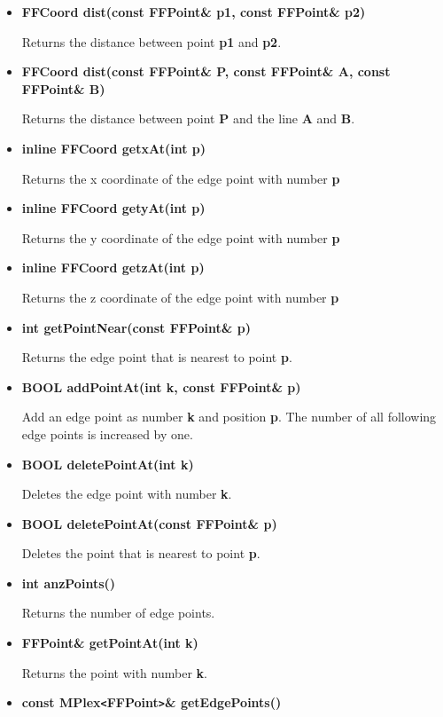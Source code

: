 \begin{itemize}
\item{\bf FFCoord dist(const FFPoint\& p1, const FFPoint\& p2)}

Returns the distance between point {\bf p1} and {\bf p2}.

\item{\bf FFCoord dist(const FFPoint\& P, const FFPoint\& A, 
        const FFPoint\& B)}
  
Returns the distance between point {\bf P} and the line {\bf A} and
{\bf B}.

\item{\bf inline FFCoord getxAt(int p)}

Returns the x coordinate of the edge point with number {\bf p}

\item{\bf inline FFCoord getyAt(int p)}

Returns the y coordinate of the edge point with number {\bf p}

\item{\bf inline FFCoord getzAt(int p)}

Returns the z coordinate of the edge point with number {\bf p}

\item{\bf int getPointNear(const FFPoint\& p)}

Returns the edge point that is nearest to point {\bf p}.

\item{\bf BOOL addPointAt(int k, const FFPoint\& p)}

Add an edge point as number {\bf k} and position {\bf p}. The number
of all following edge points is increased by one.

\item{\bf BOOL deletePointAt(int k)}

Deletes the edge point with number {\bf k}.

\item{\bf BOOL deletePointAt(const FFPoint\& p)}

Deletes the point that is nearest to point {\bf p}.

\item{\bf int anzPoints()}

Returns the number of edge points.

\item{\bf FFPoint\& getPointAt(int k)}

Returns the point with number {\bf k}.

\item{\bf const MPlex\verb|<|FFPoint\verb|>|\& getEdgePoints()}
                        

\end{itemize}

